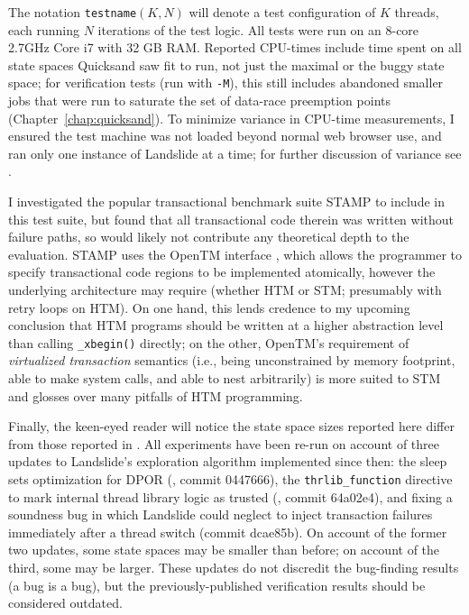 The notation {\tt testname}$(K,N)$ will denote a test configuration of $K$ threads, each running $N$ iterations of the test logic.
All tests were run on an 8-core 2.7GHz Core i7 with 32 GB RAM.
Reported CPU-times include time spent on all state spaces
Quicksand saw fit to run,
not just the maximal or the buggy state space;
for verification tests (run with {\tt -M}),
this still includes abandoned smaller jobs that were run to saturate the set of data-race preemption points
(Chapter~\ref{chap:quicksand}).
To minimize variance in CPU-time measurements,
I ensured the test machine was not loaded beyond normal web browser use,
and ran only one instance of Landslide at a time;
for further discussion of variance see \cite{sigbovik-htm}.

I investigated the popular transactional benchmark suite STAMP \cite{stamp}
to include in this test suite,
but found that all transactional code therein was written without failure paths,
so would likely not contribute any theoretical depth to the evaluation.
STAMP uses the OpenTM interface \cite{opentm},
which allows the programmer to specify transactional code regions to be implemented atomically,
however the underlying architecture may require
(whether HTM or STM; presumably with retry loops on HTM).
On one hand,
this lends credence to my upcoming conclusion
that HTM programs should be written at a higher abstraction level than calling {\tt \_xbegin()} directly;
on the other,
OpenTM's requirement of {\em virtualized transaction} semantics
(i.e., being unconstrained by memory footprint, able to make system calls, and able to nest arbitrarily)
is more suited to STM and glosses over many pitfalls of HTM programming.

Finally, the keen-eyed reader will notice the state space sizes reported here
differ from those reported in \cite{sigbovik-htm}.
All experiments have been re-run
on account of three updates to Landslide's exploration algorithm
implemented since then:
the sleep sets optimization for DPOR (\sect{\ref{sec:landslide-explore}}, commit 0447666),
the {\tt thrlib\_function} directive
to mark internal thread library logic as trusted (\sect{\ref{sec:landslide-config-landslide}}, commit 64a02e4),
and fixing a soundness bug in which Landslide could neglect to inject transaction failures
immediately after a thread switch (commit dcae85b).
On account of the former two updates, some state spaces may be smaller than before;
on account of the third, some may be larger.
These updates do not discredit the bug-finding results (a bug is a bug),
but the previously-published verification results should be considered outdated.

